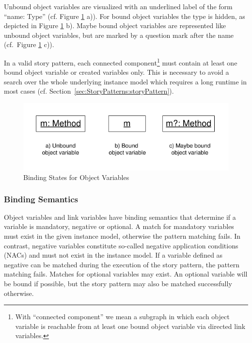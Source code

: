 Unbound object variables are visualized with an underlined label of the form
``name: Type'' (cf. Figure \ref{fig:bindingStatesOverview} a)).
For bound object variables the type is hidden, as depicted
in Figure \ref{fig:bindingStatesOverview} b).
Maybe bound object variables are represented like unbound object variables, but
are marked by a question mark after the name (cf.\ Figure
\ref{fig:bindingStatesOverview} c)).

In a valid story pattern, each connected component\footnote{With
``connected component'' we mean a subgraph in which each object variable is
reachable from at least one bound object variable via directed link variables.}
must contain at least one bound object variable or created variables only. This
is necessary to avoid a search over the whole underlying instance model which requires a long runtime in most cases (cf. Section~\ref{sec:StoryPatterns:storyPattern}).

\begin{figure}[htbp]
  \centering
  \includegraphics[scale=1.2]{figures/BindingStatesOverview}
  \caption{Binding States for Object Variables}
  \label{fig:bindingStatesOverview}
\end{figure}

\subsubsection{Binding Semantics}
\label{sec:StoryPatterns:binding:semantics}
Object variables and link variables have binding semantics that
determine if a variable is mandatory, negative or optional.
A match for mandatory variables must exist in the given instance model, otherwise
the pattern matching fails. 
In contrast, negative variables constitute so-called negative application
conditions (NACs) and must not exist in the instance model. If a variable defined as
negative can be matched during the execution of the story pattern, the pattern matching
fails. Matches for optional variables may exist. An optional variable will be
bound if possible, but the story pattern may also be matched
successfully otherwise.

